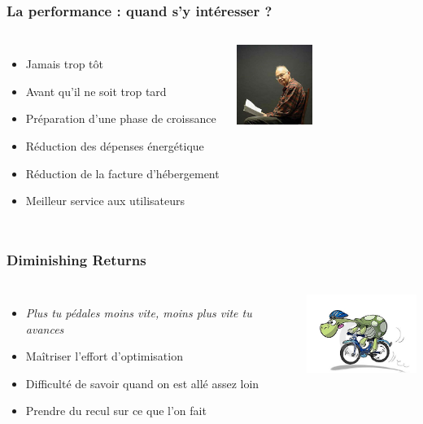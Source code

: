 \documentclass{beamer}
\begin{document}
\begin{frame}
  \frametitle{La performance : quand s'y intéresser ?}

  \vfill

\begin{columns}[c]

\begin{itemize}
  \item Jamais trop tôt
  \item Avant qu'il ne soit trop tard
  \item Préparation d'une phase de croissance
  \item Réduction des dépenses énergétique
  \item Réduction de la facture d'hébergement
  \item Meilleur service aux utilisateurs
\end{itemize}

\begin{center}
  \includegraphics[height=7em]{knuth.jpg}
\end{center}
\end{columns}
\end{frame}

\begin{frame}
  \frametitle{Diminishing Returns}

  \vfill

\begin{columns}[c]

  \begin{itemize}
  \item \textit{Plus tu pédales moins vite, moins plus vite tu avances}
  \item Maîtriser l'effort d'optimisation
  \item Difficulté de savoir quand on est allé assez loin
  \item Prendre du recul sur ce que l'on fait
  \end{itemize}

\begin{center}
  \includegraphics[height=7em]{cartoon-velo.jpg}
\end{center}
\end{columns}
\end{frame}
\end{document}
